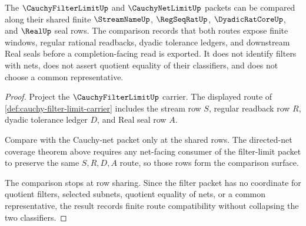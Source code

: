 \begin{theorem}
\label{thm:cauchy-net-limit-filter-comparison}
The $\CauchyFilterLimitUp$ and $\CauchyNetLimitUp$ packets can be compared along their shared finite $\StreamNameUp$, $\RegSeqRatUp$, $\DyadicRatCoreUp$, and $\RealUp$ seal rows. The comparison records that both routes expose finite windows, regular rational readbacks, dyadic tolerance ledgers, and downstream Real seals before a completion-facing read is exported. It does not identify filters with nets, does not assert quotient equality of their classifiers, and does not choose a common representative.
\end{theorem}
\begin{proof}
Project the $\CauchyFilterLimitUp$ carrier. The displayed route of \autoref{def:cauchy-filter-limit-carrier} includes the stream row $S$, regular readback row $R$, dyadic tolerance ledger $D$, and Real seal row $A$.

Compare with the Cauchy-net packet only at the shared rows. The directed-net coverage theorem above requires any net-facing consumer of the filter-limit packet to preserve the same $S,R,D,A$ route, so those rows form the comparison surface.

The comparison stops at row sharing. Since the filter packet has no coordinate for quotient filters, selected subnets, quotient equality of nets, or a common representative, the result records finite route compatibility without collapsing the two classifiers.
\end{proof}

